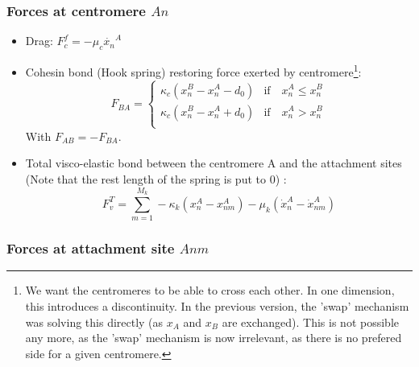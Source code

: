 \documentclass[a4paper,12pt]{article}
\renewcommand{\leq}{\leqslant}
\begin{document}
\subsubsection{Forces at centromere $An$}

\begin{itemize}
\item Drag: $F_c^f = -\mu_c \dot{x_n}^A$
\item Cohesin bond (Hook spring) restoring force exerted by
  centromere\footnote{We want the centromeres to be able to cross each
    other. In one dimension, this introduces a discontinuity. In the
    previous version, the 'swap' mechanism was solving this directly
    (as $x_A$ and $x_B$ are exchanged). This is not possible any more,
    as the 'swap' mechanism is now irrelevant, as there is no prefered
    side for a given centromere.}:
  \begin{equation}
    F_{BA} =
    \begin{cases}
      \kappa_c (x_n^B - x_n^A - d_0) &\mathrm{if}\quad x_n^A \leq x_n^B\\
      \kappa_c (x_n^B - x_n^A + d_0) &\mathrm{if}\quad  x_n^A > x_n^B\\
    \end{cases}
  \end{equation}
  With $F_{AB} = - F_{BA}$. 
\item Total visco-elastic bond between the centromere A and the attachment
  sites (Note that the rest length of the spring is put to 0) :
  $$ F_v^T = \sum_{m = 1}^{M_k} -\kappa_k(x_n^A - x_{nm}^A) 
  - \mu_k(\dot{x}_n^A - \dot{x}_{nm}^A) $$
\end{itemize}


\subsubsection{Forces at attachment site $Anm$}
\end{document}
